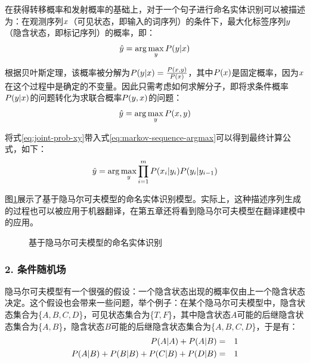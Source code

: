 \parinterval 在获得转移概率和发射概率的基础上，对于一个句子进行命名实体识别可以被描述为：在观测序列${x}$（可见状态，即输入的词序列）的条件下，最大化标签序列${y}$（隐含状态，即标记序列）的概率，即：
\begin{eqnarray}
\hat{{y}} = \arg\max_{{y}}{P}({y}|{x})
\label{eq:3.3-3}
\end{eqnarray}

\parinterval 根据贝叶斯定理，该概率被分解为${P}({y}|{x})=\frac{{P}({x},{y})}{{P}({x})}$，其中${P}({x})$是固定概率，因为${x}$在这个过程中是确定的不变量。因此只需考虑如何求解分子，即将求条件概率${P}({y}|{x})$的问题转化为求联合概率${P}({y},{x})$的问题：
\begin{eqnarray}
\hat{{y}} = \arg\max_{{y}}{P}({x},{y}) \label{eq:markov-sequence-argmax}
\label{eq:3.3-4}
\end{eqnarray}

\parinterval 将式\eqref{eq:joint-prob-xy}带入式\eqref{eq:markov-sequence-argmax}可以得到最终计算公式，如下：
\begin{eqnarray}
\hat{{y}} = \arg\max_{{y}}\prod_{i=1}^{m}{P}(x_i|y_i){P}(y_i|y_{i-1})
\label{eq:3.3-5}
\end{eqnarray}

\parinterval 图\ref{fig:3.3-4}展示了基于隐马尔可夫模型的命名实体识别模型。实际上，这种描述序列生成的过程也可以被应用于机器翻译，在第五章还将看到隐马尔可夫模型在翻译建模中的应用。

\begin{figure}[htp]
\centering

\caption{基于隐马尔可夫模型的命名实体识别}
\label{fig:3.3-4}
\end{figure}


\subsubsection{2. 条件随机场}

\parinterval 隐马尔可夫模型有一个很强的假设：一个隐含状态出现的概率仅由上一个隐含状态决定。这个假设也会带来一些问题，举个例子：在某个隐马尔可夫模型中，隐含状态集合为\{$A, B, C, D$\}，可见状态集合为\{$T, F$\}，其中隐含状态$A$可能的后继隐含状态集合为\{$A, B$\}，隐含状态$B$可能的后继隐含状态集合为\{$A, B, C, D$\}，于是有：
\begin{eqnarray}
{P}(A|A)+{P}(A|B) & = & 1 \label{eq:3.3-6} \\
{P}(A|B)+{P}(B|B)+{P}(C|B)+{P}(D|B) & = & 1 \label{eq:3.3-7}
\end{eqnarray}

